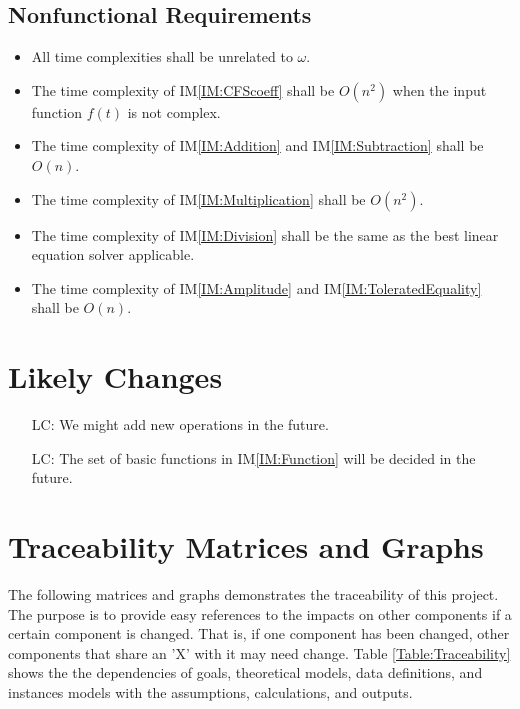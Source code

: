 \documentclass[12pt]{article}
\newcommand{\iref}[1]{IM\ref{#1}}
\newcounter{lcnum} %
\begin{document}
\subsection{Nonfunctional Requirements}

\begin{itemize}
	\item All time complexities shall be unrelated to $\omega$.
	\item The time complexity of \iref{IM:CFScoeff} shall be $O(n^2)$ 
	when the input function $f(t)$ is not complex.
	\item The time complexity of \iref{IM:Addition} and \iref{IM:Subtraction} 
	shall be $O(n)$.
	\item The time complexity of \iref{IM:Multiplication} shall be $O(n^2)$.
	\item The time complexity of \iref{IM:Division} shall be the same 
	as the best linear equation solver applicable.
	\item The time complexity of \iref{IM:Amplitude} 
	and \iref{IM:ToleratedEquality} shall be $O(n)$.
\end{itemize}

\section{Likely Changes}\label{Sc:LC}    
\noindent \begin{itemize}
\item[LC\refstepcounter{lcnum}\thelcnum\label{LC:NewOperation}:] 
We might add new operations in the future.
\item[LC\refstepcounter{lcnum}\thelcnum\label{LC:BasicFunction}:] 
The set of basic functions in \iref{IM:Function} will be 
decided in the future.
\end{itemize}

\section{Traceability Matrices and Graphs}\label{Sc:Trace}
The following matrices and graphs demonstrates the traceability 
of this project. The purpose is to provide easy references 
to the impacts on other components if a certain component is changed. 
That is, if one component has been changed, other components that share 
an 'X' with it may need change. Table \ref{Table:Traceability} 
shows the the dependencies of goals, theoretical models, 
data definitions, and instances models with the assumptions, 
calculations, and outputs.
\end{document}
